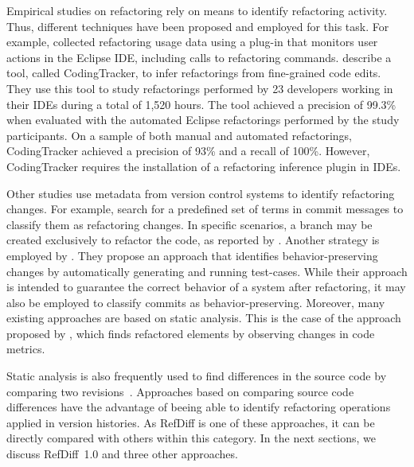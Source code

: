 Empirical studies on refactoring rely on means to identify refactoring activity. Thus, different techniques have been proposed and employed for this task.
For example, \cite{MurphyHill2012} collected refactoring usage data using a plug-in that monitors user actions in the Eclipse IDE, including calls to refactoring commands.
\cite{negara2013} describe a tool, called CodingTracker, to infer refactorings from fine-grained code edits. They use this tool to study refactorings performed by 23 developers working in their IDEs during a total of 1,520 hours. The tool achieved a precision of 99.3\% when evaluated with the automated Eclipse refactorings performed by the study participants.
On a sample of both manual and automated refactorings, CodingTracker achieved a precision of 93\% and a recall of 100\%.
However, CodingTracker requires the installation of a refactoring inference plugin in IDEs.

Other studies use metadata from version control systems to identify refactoring changes. For example, \cite{ratzinger2008relation} search for a predefined set of terms in commit messages to classify them as refactoring changes. In specific scenarios, a branch may be created exclusively to refactor the code, as reported by \cite{kim-tse-2014}.
Another strategy is employed by \cite{soares2010making}. They propose an approach that identifies behavior-preserving changes by automatically generating and running test-cases. While their approach is intended to guarantee the correct behavior of a system after refactoring, it may also be employed to classify commits as behavior-preserving.
Moreover, many existing approaches are based on static analysis.
This is the case of the approach proposed by \cite{demeyer2000finding}, which finds refactored elements by observing changes in code metrics.

Static analysis is also frequently used to find differences in the source code by comparing two revisions~\citep{dig2006automated, weissgerber2006identifying, tsantalis_empiricalstudy,prete2010template,Kim:2010:RefFinder,msr2017,tsantalis2018rminer}.
Approaches based on comparing source code differences have the advantage of beeing able to identify refactoring operations applied in version histories.
As RefDiff is one of these approaches, it can be directly compared with others within this category. In the next sections, we discuss RefDiff~1.0 and three other approaches.

